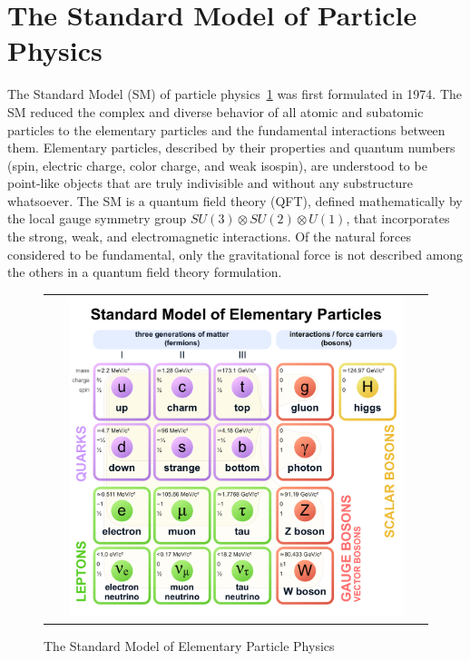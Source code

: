 \section{The Standard Model of Particle Physics}
The Standard Model (SM) of particle physics~\ref{Standard_Model} was first formulated in 1974.
The SM reduced the complex and diverse behavior of all atomic and subatomic particles to the elementary particles and the fundamental interactions between them. 
Elementary particles, described by their properties and quantum numbers (spin, electric charge, color charge, and  weak isospin), are understood to be point-like objects that are truly indivisible and without any substructure whatsoever.
The SM is a quantum field theory (QFT), defined mathematically by the local gauge symmetry group $SU(3) \otimes SU(2) \otimes U(1)$, that incorporates the strong, weak, and electromagnetic interactions.
Of the natural forces considered to be fundamental, only the gravitational force is not described among the others in a quantum field theory formulation.
\begin{figure}[!h]
  \begin{center}
    \begin{tabular}{c}
        \includegraphics[width=0.9\textwidth]{fig_Theory/Standard_Model.pdf}
    \end{tabular}
    \caption{The Standard Model of Elementary Particle Physics
            }
    \label{Standard_Model}
  \end{center}
\end{figure}

